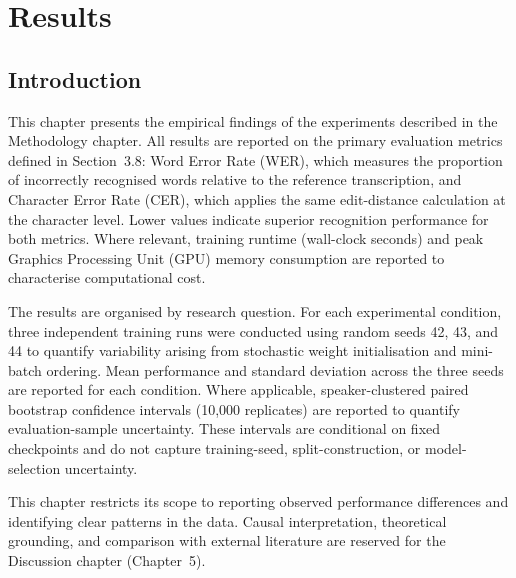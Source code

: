 %

\graphicspath{{images/}}



\section{Results}

\subsection{Introduction}

This chapter presents the empirical findings of the experiments described in the
Methodology chapter. All results are reported on the primary evaluation metrics
defined in Section~3.8: Word Error Rate (WER), which measures the proportion of
incorrectly recognised words relative to the reference transcription, and
Character Error Rate (CER), which applies the same edit-distance calculation at
the character level. Lower values indicate superior recognition performance for
both metrics. Where relevant, training runtime (wall-clock seconds) and peak
Graphics Processing Unit (GPU) memory consumption are reported to characterise
computational cost.

The results are organised by research question. For each experimental condition,
three independent training runs were conducted using random seeds 42, 43, and 44
to quantify variability arising from stochastic weight initialisation and
mini-batch ordering. Mean performance and standard deviation across the three
seeds are reported for each condition. Where applicable, speaker-clustered
paired bootstrap confidence intervals (10{,}000 replicates) are reported to
quantify evaluation-sample uncertainty. These intervals are conditional on fixed
checkpoints and do not capture training-seed, split-construction, or
model-selection uncertainty.

This chapter restricts its scope to reporting observed performance differences
and identifying clear patterns in the data. Causal interpretation, theoretical
grounding, and comparison with external literature are reserved for the
Discussion chapter (Chapter~5).


